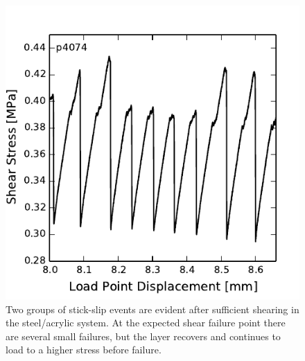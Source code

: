 \begin{figure}
\begin{centering}
\includegraphics{chap_granular_stiffness/Fig11.pdf}
\caption{\label{fig:double_ss}
Two groups of stick-slip events are evident after sufficient shearing in the steel/acrylic system.  At the expected shear failure point there are several small failures, but the layer recovers and continues to load to a higher stress before failure.}
\end{centering}
\end{figure}


